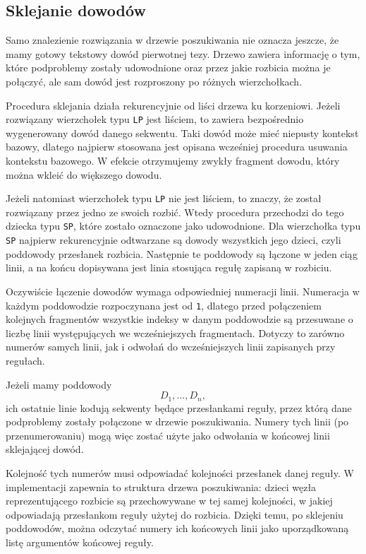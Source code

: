 \documentclass[shortabstract]{iithesis}
\theoremstyle{definition}
\theoremstyle{remark}
\theoremstyle{plain}
\begin{document}
\subsection{Sklejanie dowodów}

Samo znalezienie rozwiązania w drzewie poszukiwania nie oznacza jeszcze, że mamy
gotowy tekstowy dowód pierwotnej tezy. Drzewo zawiera informację o tym, które
podproblemy zostały udowodnione oraz przez jakie rozbicia można je połączyć, ale
sam dowód jest rozproszony po różnych wierzchołkach. 

Procedura sklejania działa rekurencyjnie od liści drzewa ku korzeniowi. Jeżeli
rozwiązany wierzchołek typu \texttt{LP} jest liściem, to zawiera bezpośrednio
wygenerowany dowód danego sekwentu. Taki dowód może mieć niepusty kontekst
bazowy, dlatego najpierw stosowana jest opisana wcześniej procedura usuwania
kontekstu bazowego. W efekcie otrzymujemy zwykły fragment dowodu, który można
wkleić do większego dowodu.

Jeżeli natomiast wierzchołek typu \texttt{LP} nie jest liściem, to znaczy, że został
rozwiązany przez jedno ze swoich rozbić. Wtedy procedura przechodzi do tego dziecka
typu \texttt{SP}, które zostało oznaczone jako udowodnione. Dla wierzchołka typu
\texttt{SP} najpierw rekurencyjnie odtwarzane są dowody wszystkich jego dzieci, czyli
poddowody przesłanek rozbicia. Następnie te poddowody są łączone w jeden ciąg
linii, a na końcu dopisywana jest linia stosująca regułę zapisaną w rozbiciu.

Oczywiście łączenie dowodów wymaga odpowiedniej numeracji linii. Numeracja w każdym poddowodzie
rozpoczynana jest od \texttt{1}, dlatego
przed połączeniem kolejnych fragmentów wszystkie indeksy w danym poddowodzie są
przesuwane o liczbę linii występujących we wcześniejszych fragmentach. Dotyczy to
zarówno numerów samych linii, jak i odwołań do wcześniejszych linii zapisanych przy
regułach.

Jeżeli mamy poddowody
\[
D_1,\ldots,D_n,
\]
ich ostatnie linie kodują sekwenty będące
przesłankami reguły, przez którą dane podproblemy zostały połączone w drzewie
poszukiwania. Numery tych linii (po przenumerowaniu) mogą więc zostać użyte jako odwołania w końcowej
linii sklejającej dowód.


Kolejność tych numerów musi odpowiadać kolejności przesłanek danej reguły. W implementacji
zapewnia to struktura drzewa poszukiwania: dzieci węzła reprezentującego rozbicie
są przechowywane w tej samej kolejności, w jakiej odpowiadają przesłankom reguły
użytej do rozbicia. Dzięki temu, po sklejeniu poddowodów, można odczytać numery
ich końcowych linii jako uporządkowaną listę argumentów końcowej reguły.
\end{document}
